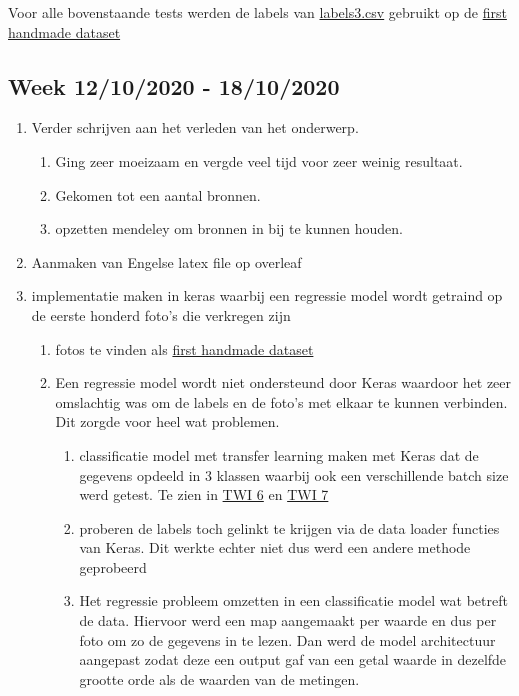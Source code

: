 \documentclass{scrartcl}
\begin{document}
Voor alle bovenstaande tests werden de labels van \href{file:///Users/larsdepauw/Documents/Lars.nosync/Documents/School/1Ma%20ing/Masterproef/TWI/code/Vision/Datasets/labels/labels3.csv}{labels3.csv} gebruikt op de \href{file:///Users/larsdepauw/Documents/Lars.nosync/Documents/School/1Ma%20ing/Masterproef/TWI/code/Vision/Datasets/handmade/first_handmade}{first handmade dataset}





\subsection{Week 12/10/2020 - 18/10/2020}



\begin{enumerate}[1]
\item Verder schrijven aan het verleden van het onderwerp. 
	\begin{enumerate}[a]
	\item Ging zeer moeizaam en vergde veel tijd voor zeer weinig resultaat. 
	\item Gekomen tot een aantal bronnen. 
	\item opzetten mendeley om bronnen in bij te kunnen houden.
	\end{enumerate}
\item Aanmaken van Engelse latex file op overleaf
\item implementatie maken in keras waarbij een regressie model wordt getraind op de eerste honderd foto's die verkregen zijn
	\begin{enumerate}[a]
	\item fotos te vinden als \href{file:///Users/larsdepauw/Documents/Lars.nosync/Documents/School/1Ma%20ing/Masterproef/TWI/code/Vision/Datasets/handmade/first_handmade}{first handmade dataset}
	\item Een regressie model wordt niet ondersteund door Keras waardoor het zeer omslachtig was om de labels en de foto's met elkaar te kunnen verbinden. Dit zorgde voor heel wat problemen.
		\begin{enumerate}[1]
		\item classificatie model met transfer learning maken met Keras dat de gegevens opdeeld in 3 klassen waarbij ook een verschillende batch size werd getest. Te zien in \href{https://colab.research.google.com/drive/1QN68qaE84fq9dBnZFNExsS5F8tZk-8Ow}{TWI 6} en  \href{https://colab.research.google.com/drive/1zeKin3shLk_ogrFCwHrzpnjJmaWaoCq0#scrollTo=CDnGBD0NGkbM}{TWI 7}
		\item proberen de labels toch gelinkt te krijgen via de data loader functies van Keras. Dit werkte echter niet dus werd een andere methode geprobeerd
		\item Het regressie probleem omzetten in een classificatie model wat betreft de data. Hiervoor werd een map aangemaakt per waarde en dus per foto om zo de gegevens in te lezen. Dan werd de model architectuur aangepast zodat deze een output gaf van een getal waarde in dezelfde grootte orde als de waarden van de metingen. 
		\end{enumerate}
	\end{enumerate}
\end{enumerate}
\end{document}

